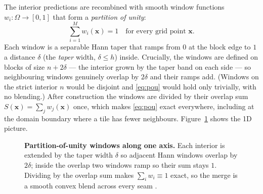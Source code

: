 \documentclass[11pt]{article}
\begin{document}
The interior predictions are recombined with smooth window functions
$w_i:\Omega\to[0,1]$ that form a \emph{partition of unity}:
\begin{equation}
\sum_{i=1}^{M} w_i(\bm x)=1\quad\text{for every grid point }\bm x.
\label{eq:pou}
\end{equation}
Each window is a separable Hann taper that ramps from $0$ at the block edge to $1$ a
distance $\delta$ (the \emph{taper} width, $\delta\le h$) inside. Crucially, the
windows are defined on blocks of size $n+2\delta$ --- the interior grown by the
taper band on each side --- so neighbouring windows genuinely overlap by $2\delta$
and their ramps add. (Windows on the strict interior $n$ would be disjoint and
\eqref{eq:pou} would hold only trivially, with no blending.) After construction the
windows are divided by their overlap sum $S(\bm x)=\sum_j w_j(\bm x)$ once, which
makes \eqref{eq:pou} exact everywhere, including at the domain boundary where a tile
has fewer neighbours. Figure~\ref{fig:pou} shows the 1D picture.

\begin{figure}[t]
\centering
{}
\caption{\textbf{Partition-of-unity windows along one axis.} Each interior is
extended by the taper width $\delta$ so adjacent Hann windows overlap by $2\delta$;
inside the overlap two windows ramp so their sum stays $1$. Dividing by the overlap
sum makes $\sum_i w_i\equiv 1$ exact, so the merge is a smooth convex blend across
every seam \cite{ronneberger2015unet,bartal2023multidiffusion}.}
\label{fig:pou}
\end{figure}
\end{document}
